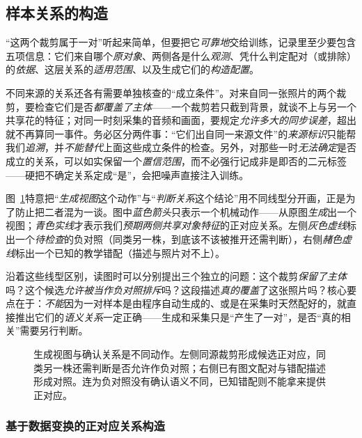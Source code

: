 \subsection{样本关系的构造}
\label{sec:data-derived-knowledge-relation-construction}

“这两个裁剪属于一对”听起来简单，但要把它\emph{可靠地}交给训练，记录里至少要包含五项信息：它们来自哪个\emph{原对象}、两侧各是什么\emph{观测}、凭什么判定配对（或排除）的\emph{依据}、这层关系的\emph{适用范围}、以及生成它们的\emph{构造配置}。

不同来源的关系还各有需要单独核查的“成立条件”。对来自同一张照片的两个裁剪，要检查它们是否\emph{都覆盖了主体}——一个裁剪若只截到背景，就谈不上与另一个共享花的特征；对同一时刻采集的音频和画面，要规定\emph{允许多大的同步误差}，超出就不再算同一事件。务必区分两件事：“它们出自同一来源文件”的\emph{来源标识}只能帮我们\emph{追溯}，并\emph{不能替代}上面这些成立条件的检查。另外，对那些一时\emph{无法确定}是否成立的关系，可以如实保留一个\emph{置信范围}，而不必强行记成非是即否的二元标签——硬把不确定关系定成“是”，会把噪声直接注入训练。

图~\ref{fig:data-derived-knowledge-relation-construction}特意把“\emph{生成视图}这个动作”与“\emph{判断关系}这个结论”用不同线型分开画，正是为了防止把二者混为一谈。图中\emph{蓝色箭头}只表示一个机械动作——从原图\emph{生成}出一个视图；\emph{青色实线}才表示我们\emph{预期两侧共享对象特征}的正对应关系。左侧\emph{灰色虚线}标出一个\emph{待检查}的负对照（同类另一株，到底该不该被推开还需判断），右侧\emph{赭色虚线}标出一个已知的教学错配（描述与照片对不上）。

沿着这些线型区别，读图时可以分别提出三个独立的问题：这个裁剪\emph{保留了主体}吗？这个候选\emph{允许被当作负对照排斥}吗？这段描述\emph{真的覆盖}了这张照片吗？核心要点在于：\emph{不能}因为一对样本是由程序自动生成的、或是在采集时天然配好的，就直接推出它们的\emph{语义关系}一定正确——生成和采集只是“产生了一对”，是否“真的相关”需要另行判断。

\begin{figure}[htbp]
  \centering
  
  \caption{生成视图与确认关系是不同动作。左侧同源裁剪形成候选正对应，同类另一株还需判断是否允许作负对照；右侧已有图文配对与错配描述形成对照。连为负对照没有确认语义不同，已知错配则不能拿来提供正对应。}
  \label{fig:data-derived-knowledge-relation-construction}
\end{figure}
\FloatBarrier

\subsubsection{基于数据变换的正对应关系构造}
\label{sec:data-derived-knowledge-transformation-positive}

